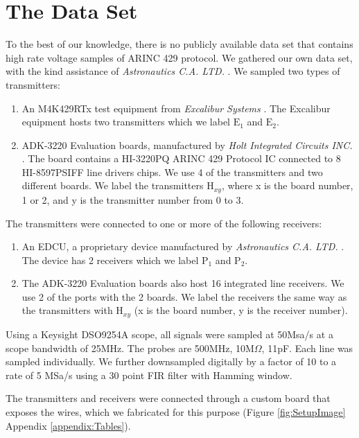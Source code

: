\documentclass[english]{llncs}
\newcommand{\level}[1]{\section{#1}}
\newcommand{\level}[1]{\chapter{#1}}
\begin{document}
 \vspace*{-2ex} %
\level{The Data Set} \label{TheDataSet}
  To the best of our knowledge, there is no publicly available data set that contains high rate voltage samples of ARINC 429 protocol. We gathered our own data set, with the kind assistance of \textit{Astronautics C.A. LTD.} \cite{astronautics2019home}.   We sampled two types of transmitters:
  \begin{enumerate}
   \vspace*{-1ex} %
     \item An M4K429RTx test equipment from \textit{Excalibur Systems} \cite{excalibur2019m4k429rtx}. The Excalibur equipment hosts two transmitters which we label \(\text{E}_1\) and \(\text{E}_2\).
     \item ADK-3220 Evaluation boards, manufactured by \textit{Holt Integrated Circuits INC.} \cite{holt2019evaluation}. The board contains a HI-3220PQ ARINC 429 Protocol IC connected to 8 HI-8597PSIFF line drivers chips. We use 4 of the transmitters and two different boards. We label the transmitters \(\text{H}_{xy}\), where x is the board number, 1 or 2, and y is the transmitter number from 0 to 3.
  \end{enumerate}
  
  \noindent The transmitters were connected to one or more of the following receivers:
  \begin{enumerate}
   \vspace*{-1ex} %
    \item An EDCU, a proprietary device manufactured by \textit{Astronautics C.A. LTD.} \cite{astronautics2019edcu}. The device has 2 receivers which we label \(\text{P}_1\) and \(\text{P}_2\).
    \item The ADK-3220 Evaluation boards also host 16 integrated line receivers. We use 2 of the ports with the 2 boards. We label the receivers the same way as the transmitters with \(\text{H}_{xy}\) (x is the board number, y is the receiver number).
  \end{enumerate}
  
  Using a Keysight DSO9254A scope, all signals were sampled at 50Msa/s at a scope bandwidth of 25MHz. The probes are 500MHz, 10M\(\Omega\), 11pF. Each line was sampled individually. We further downsampled digitally by a factor of 10 to a rate of 5 MSa/s using a 30 point FIR filter with Hamming window.
  
  The transmitters and receivers were connected through a custom board that exposes the wires, which we fabricated for this purpose (Figure \ref{fig:SetupImage} Appendix \ref{appendix:Tables}).
  
\end{document}
